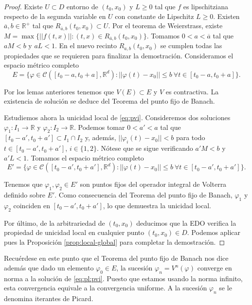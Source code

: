 \documentclass{article}
\begin{document}
\begin{proof}
  Existe $U \subset D$ entorno de $(t_0, x_0)$ y $L \ge 0$ tal que $f$ es lipschitziana respecto de
  la segunda variable en $U$ con constante de Lipschitz $L \ge 0$. Existen
  $\overline{a}, b \in \mathbb{R}^+$ tal que $R_{\overline{a},b}(t_0, x_0) \subset U$. Por el
  teorema de Weierstrass, existe $M = \max \{||f(t,x)|| : (t,x) \in R_{\overline{a},b}(t_0,
  x_0)\}$. Tomamos $0 < a < \overline{a}$ tal que $a M < b$ y $a L < 1$. En el nuevo recinto
  $R_{a,b}(t_0, x_0)$ se cumplen todas las propiedades que se requieren para finalizar la
  demostración. Consideramos el espacio métrico completo
  \[E = \{\varphi \in \mathcal{C}([t_0-a, t_0+a], \mathbb{R}^d): ||\varphi(t)-x_0|| \le b \ \forall
    t \in [t_0-a, t_0+a]\}.\]

  Por los lemas anteriores tenemos que $V(E) \subset E$ y $V$ es contractiva. La existencia de
  solución se deduce del Teorema del punto fijo de Banach.

  Estudiemos ahora la unicidad local de \eqref{eq:pvi}. Consideremos dos soluciones
  $\varphi_1: I_1 \to \mathbb{R}$ y $\varphi_2: I_2 \to \mathbb{R}$. Podemos tomar $0 < a' < a$ tal
  que $[t_0-a', t_0+a'] \subset I_1 \cap I_2$ y, además, $||\varphi_i(t)-x_0|| < b$ para todo
  $t\in [t_0-a', t_0+a']$, $i \in \{1,2\}$. Nótese que se sigue verificando $a'M < b$ y $a'L <
  1$. Tomamos el espacio métrico completo
  \[E' = \{\varphi \in \mathcal{C}([t_0-a', t_0+a'], \mathbb{R}^d): ||\varphi(t)-x_0|| \le b \
    \forall t \in [t_0-a', t_0+a']\}.\]

  Tenemos que $\varphi_1, \varphi_2 \in E'$ son puntos fijos del operador integral de Volterra
  definido sobre $E'$. Como consecuencia del Teorema del punto fijo de Banach, $\varphi_1$ y
  $\varphi_2$ coinciden en $[t_0-a', t_0+a']$, lo que demuestra la unicidad local.

  Por último, de la arbitrariedad de $(t_0, x_0)$ deducimos que la EDO verifica la propiedad de
  unicidad local en cualquier punto $(t_0, x_0) \in D$. Podemos aplicar pues la Proposición
  \ref{prop:local-global} para completar la demostración.
\end{proof}

Recuérdese en este punto que el Teorema del punto fijo de Banach nos dice además que dado un
elemento $\varphi_0 \in E$, la sucesión $\varphi_n = V^n(\varphi)$ converge en norma a la solución
de \ref{eq:pl:pvi}. Puesto que estamos usando la norma infinito, esta convergencia equivale a la
convergencia uniforme. A la sucesión $\varphi_n$ se le denomina iterantes de Picard.
\end{document}
